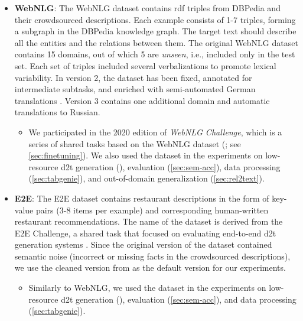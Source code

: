 {\begin{itemize}
    \item \textbf{WebNLG}: The WebNLG dataset \cite{gardentCreatingTrainingCorpora2017,gardentWebNLGChallengeGenerating2017} contains \ac{rdf} triples from DBPedia \cite{auer2007dbpedia} and their crowdsourced descriptions. Each example consists of 1-7 triples, forming a subgraph in the DBPedia knowledge graph. The target text should describe all the entities and the relations between them. The original WebNLG dataset \cite{gardentCreatingTrainingCorpora2017} contains 15 domains, out of which 5 are \emph{unseen}, i.e., included only in the test set. Each set of triples included several verbalizations to promote lexical variability. In version 2, the dataset has been fixed, annotated for intermediate subtasks, and enriched with semi-automated German translations \cite{shimorinaHandlingRareItems2018,castroferreiraEnrichingWebNLGCorpus2018}. Version 3 \cite{ferreira20202020} contains one additional domain and automatic translations to Russian.
          \begin{itemize}
              \item
                    We participated in the 2020 edition of \emph{WebNLG Challenge}, which is a series of shared tasks based on the WebNLG dataset (\citealp{gardentWebNLGChallengeGenerating2017,shimorinaWebNLGChallengeHuman2019,ferreira20202020,cripwell2023WebNLGShared2023}; see \autoref{sec:finetuning}). We also used the dataset in the experiments on low-resource \ac{d2t} generation (), evaluation (\autoref{sec:sem-acc}), data processing (\autoref{sec:tabgenie}), and out-of-domain generalization (\autoref{sec:rel2text}).
          \end{itemize}

    \item \textbf{E2E}: The E2E dataset \cite{dusekEvaluatingStateoftheartEndtoEnd2020,dusekSemanticNoiseMatters2019} contains restaurant descriptions in the form of key-value pairs (3-8 items per example) and corresponding human-written restaurant recommendations. The name of the dataset is derived from the E2E Challenge, a shared task that focused on evaluating end-to-end \ac{d2t} generation systems \cite{dusekEvaluatingStateoftheartEndtoEnd2020}. Since the original version of the dataset contained semantic noise (incorrect or missing facts in the crowdsourced descriptions), we use the cleaned version from \citet{dusekSemanticNoiseMatters2019} as the default version for our experiments.
          \begin{itemize}
              \item
                    Similarly to WebNLG, we used the dataset in the experiments on low-resource \ac{d2t} generation (), evaluation (\autoref{sec:sem-acc}), and data processing (\autoref{sec:tabgenie}).
          \end{itemize}


\end{itemize}}
